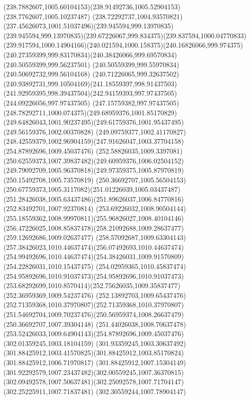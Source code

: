 {{	\curveto(238.7882607,1005.60104153)(238.91492736,1005.52904153)(238.7762607,1005.10237487)
	\curveto(238.72292737,1004.93570821)(237.45626073,1001.51037496)(239.945594,999.13970835)
	\curveto(239.945594,999.13970835)(239.67226067,999.834375)(239.837594,1000.04770833)
	\curveto(239.917594,1000.14904166)(240.021594,1000.158375)(240.16826066,999.974375)
	\curveto(240.27359399,999.83170834)(240.38426066,999.69570834)(240.50559399,999.56237501)
	\lineto(240.50559399,999.55970834)
	\lineto(240.50692732,999.56104168)
	\curveto(240.71226065,999.32637502)(240.93892731,999.10504169)(241.18559397,998.91437503)
	\curveto(241.92959395,998.39437504)(242.94159393,997.97437505)(244.09226056,997.97437505)
	\curveto(247.15759382,997.97437505)(248.78292711,1000.074375)(249.68959376,1001.85170829)
	\curveto(249.64826043,1001.90237495)(249.61759376,1001.95437495)(249.56159376,1002.00370828)
	\curveto(249.09759377,1002.41170827)(248.42559379,1002.96904159)(247.91626047,1003.37704158)
	\moveto(254.87892696,1009.45037476)
	\curveto(252.58826035,1009.3397081)(250.62559373,1007.39837482)(249.60959376,1006.02504152)
	\curveto(249.79092709,1005.96370818)(249.97359375,1005.87970819)(250.15492708,1005.73570819)
	\curveto(250.36692707,1005.56504153)(250.67759373,1005.3117082)(251.01226039,1005.03437487)
	\curveto(251.28426038,1005.63437486)(251.89626037,1006.84770816)(252.83492701,1007.92370814)
	\curveto(253.69226032,1008.90504144)(255.18559362,1008.99970811)(255.96826027,1008.40104146)
	\curveto(256.47226025,1008.85837478)(258.21092688,1009.28637477)(259.12692686,1009.02637477)
	\curveto(258.57092687,1009.63304143)(257.38426023,1010.44637474)(256.07492693,1010.44637474)
	\curveto(254.99492696,1010.44637474)(254.38426031,1009.91570809)(254.22826031,1010.15437475)
	\curveto(254.02959365,1010.45837474)(254.95892696,1010.91037473)(254.95892696,1010.91037473)
	\curveto(253.68292699,1010.8570414)(252.75626035,1009.35837477)(252.36959369,1009.54237476)
	\curveto(252.13892703,1009.65437476)(252.71359368,1010.37970807)(252.71359368,1010.37970807)
	\curveto(251.54692704,1009.70237476)(250.56959374,1008.26637479)(250.36692707,1007.39304148)
	\curveto(251.44026038,1008.70637478)(253.52426033,1009.64904143)(254.87892696,1009.45037476)
	\moveto(302.01359245,1003.18104159)
	\curveto(301.93359245,1003.30637492)(301.88425912,1003.41570825)(301.88425912,1003.85170824)
	\lineto(301.88425912,1006.71970817)
	\curveto(301.88425912,1007.15304149)(301.92292579,1007.23437482)(302.00559245,1007.36370815)
	\curveto(302.09492578,1007.50637481)(302.25092578,1007.71704147)(302.25225911,1007.71837481)
	\lineto(302.30559244,1007.78904147)
}}
